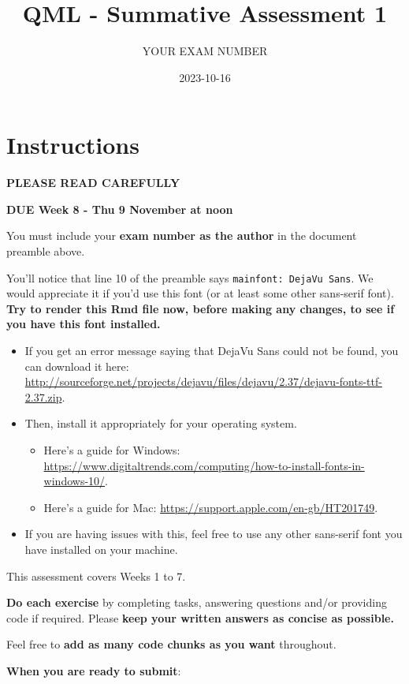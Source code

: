 \documentclass[
]{article}
\title{QML - Summative Assessment 1}
\author{YOUR EXAM NUMBER}
\date{2023-10-16}
\providecommand{\tightlist}{%
  \setlength{\itemsep}{0pt}\setlength{\parskip}{0pt}}
\begin{document}
\maketitle

\section{Instructions}\label{instructions}

\textbf{PLEASE READ CAREFULLY}

\textbf{DUE Week 8 - Thu 9 November at noon}

You must include your \textbf{exam number as the author} in the document
preamble above.

You'll notice that line 10 of the preamble says
\texttt{mainfont:\ DejaVu\ Sans}. We would appreciate it if you'd use
this font (or at least some other sans-serif font). \textbf{Try to
render this Rmd file now, before making any changes, to see if you have
this font installed.}

\begin{itemize}
\tightlist
\item
  If you get an error message saying that DejaVu Sans could not be
  found, you can download it here:
  \url{http://sourceforge.net/projects/dejavu/files/dejavu/2.37/dejavu-fonts-ttf-2.37.zip}.
\item
  Then, install it appropriately for your operating system.

  \begin{itemize}
  \tightlist
  \item
    Here's a guide for Windows:
    \url{https://www.digitaltrends.com/computing/how-to-install-fonts-in-windows-10/}.
  \item
    Here's a guide for Mac:
    \url{https://support.apple.com/en-gb/HT201749}.
  \end{itemize}
\item
  If you are having issues with this, feel free to use any other
  sans-serif font you have installed on your machine.
\end{itemize}

This assessment covers Weeks 1 to 7.

\textbf{Do each exercise} by completing tasks, answering questions
and/or providing code if required. Please \textbf{keep your written
answers as concise as possible.}

Feel free to \textbf{add as many code chunks as you want} throughout.

\textbf{When you are ready to submit}:
\end{document}
